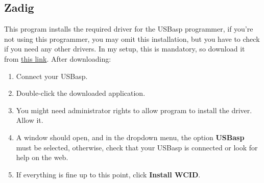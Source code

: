 \documentclass[10pt,letterpaper]{article}
\begin{document}
\subsection{Zadig}
This program installs the required driver for the USBasp programmer, if you’re not using this programmer, you may omit this installation, but you have to check if you need any other drivers. In my setup, this is mandatory, so download it from \href{https://zadig.akeo.ie/}{this link}. After downloading:
\begin{enumerate}
    \item Connect your USBasp.
    \item Double-click the downloaded application.
    \item You might need administrator rights to allow program to install the driver. Allow it.
    \item A window should open, and in the dropdown menu, the option \textbf{USBasp} must be selected, otherwise, check that your USBasp is connected or look for help on the web.
    \item If everything is fine up to this point, click \textbf{Install WCID}.
\end{enumerate}
\end{document}
